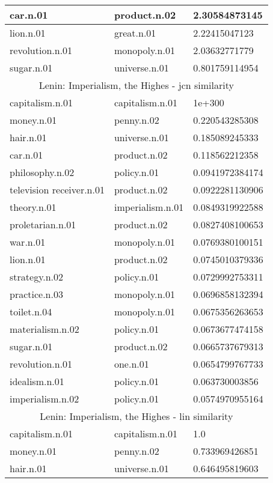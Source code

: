 \begin{center}
\begin{tabular}{ | l | l | l |}
car.n.01 & product.n.02 & 2.30584873145 \\ \hline
lion.n.01 & great.n.01 & 2.22415047123 \\ \hline
revolution.n.01 & monopoly.n.01 & 2.03632771779 \\ \hline
sugar.n.01 & universe.n.01 & 0.801759114954 \\ \hline
\multicolumn{3}{|c|}{Lenin: Imperialism, the Highes - jcn similarity} \\ \hline
capitalism.n.01 & capitalism.n.01 & 1e+300 \\ \hline
money.n.01 & penny.n.02 & 0.220543285308 \\ \hline
hair.n.01 & universe.n.01 & 0.185089245333 \\ \hline
car.n.01 & product.n.02 & 0.118562212358 \\ \hline
philosophy.n.02 & policy.n.01 & 0.0941972384174 \\ \hline
television receiver.n.01 & product.n.02 & 0.0922281130906 \\ \hline
theory.n.01 & imperialism.n.01 & 0.0849319922588 \\ \hline
proletarian.n.01 & product.n.02 & 0.0827408100653 \\ \hline
war.n.01 & monopoly.n.01 & 0.0769380100151 \\ \hline
lion.n.01 & product.n.02 & 0.0745010379336 \\ \hline
strategy.n.02 & policy.n.01 & 0.0729992753311 \\ \hline
practice.n.03 & monopoly.n.01 & 0.0696858132394 \\ \hline
toilet.n.04 & monopoly.n.01 & 0.0675356263653 \\ \hline
materialism.n.02 & policy.n.01 & 0.0673677474158 \\ \hline
sugar.n.01 & product.n.02 & 0.0665737679313 \\ \hline
revolution.n.01 & one.n.01 & 0.0654799767733 \\ \hline
idealism.n.01 & policy.n.01 & 0.063730003856 \\ \hline
imperialism.n.02 & policy.n.01 & 0.0574970955164 \\ \hline
\multicolumn{3}{|c|}{Lenin: Imperialism, the Highes - lin similarity} \\ \hline
capitalism.n.01 & capitalism.n.01 & 1.0 \\ \hline
money.n.01 & penny.n.02 & 0.733969426851 \\ \hline
hair.n.01 & universe.n.01 & 0.646495819603 \\ \hline

\end{tabular}
\end{center}
